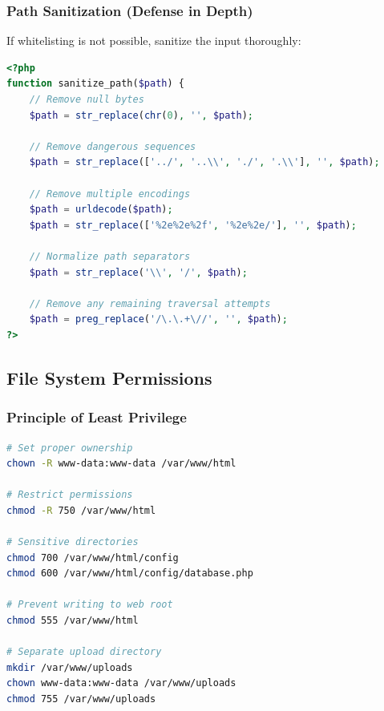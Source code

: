 \documentclass[12pt]{article}
\begin{document}
\subsubsection{Path Sanitization (Defense in Depth)}

If whitelisting is not possible, sanitize the input thoroughly:

\begin{lstlisting}[language=PHP, caption=Path Sanitization Functions]
<?php
function sanitize_path($path) {
    // Remove null bytes
    $path = str_replace(chr(0), '', $path);
    
    // Remove dangerous sequences
    $path = str_replace(['../', '..\\', './', '.\\'], '', $path);
    
    // Remove multiple encodings
    $path = urldecode($path);
    $path = str_replace(['%2e%2e%2f', '%2e%2e/'], '', $path);
    
    // Normalize path separators
    $path = str_replace('\\', '/', $path);
    
    // Remove any remaining traversal attempts
    $path = preg_replace('/\.\.+\//', '', $path);
?>
\end{lstlisting}


\subsection{File System Permissions}

\subsubsection{Principle of Least Privilege}

\begin{lstlisting}[language=bash, caption=Secure File Permissions]
# Set proper ownership
chown -R www-data:www-data /var/www/html

# Restrict permissions
chmod -R 750 /var/www/html

# Sensitive directories
chmod 700 /var/www/html/config
chmod 600 /var/www/html/config/database.php

# Prevent writing to web root
chmod 555 /var/www/html

# Separate upload directory
mkdir /var/www/uploads
chown www-data:www-data /var/www/uploads
chmod 755 /var/www/uploads
\end{lstlisting}
\end{document}
